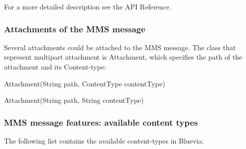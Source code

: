 For a more detailed description see the API Reference.\hypertarget{blv_mms_mt_guide_mms_mt_message_features_adding_attachments_sec}{}\subsubsection{Attachments of the MMS message}\label{blv_mms_mt_guide_mms_mt_message_features_adding_attachments_sec}
Several attachments could be attached to the MMS message. The class that represent multipart attachment is Attachment, which specifies the path of the attachment and its Content-\/type:


\begin{DoxyCode}
Attachment(String path, ContentType contentType)
\end{DoxyCode}



\begin{DoxyCode}
Attachment(String path, String contentType)
\end{DoxyCode}
\hypertarget{blv_mms_mt_guide_mms_message_features_content}{}\subsubsection{MMS message features: available content types}\label{blv_mms_mt_guide_mms_message_features_content}
The following list contains the available content-\/types in Bluevia:


